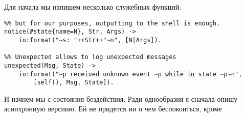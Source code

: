 Для начала мы напишем несколько служебных функций:
\begin{lstlisting}[style=erlang]
%% Send players a notice. This could be messages to their clients
%% but for our purposes, outputting to the shell is enough.
notice(#state{name=N}, Str, Args) ->
	io:format("~s: "++Str++"~n", [N|Args]).
 
%% Unexpected allows to log unexpected messages
unexpected(Msg, State) ->
	io:format("~p received unknown event ~p while in state ~p~n",
		[self(), Msg, State]).
\end{lstlisting}
И начнем мы с состояния бездействия.
Ради однообразия я сначала опишу асинхронную версиию.
Ей не придется ни о чем беспокоиться, кроме 
